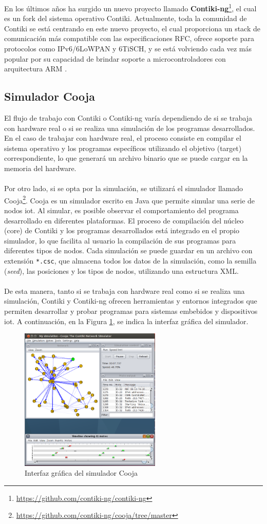 En los últimos años ha surgido un nuevo proyecto llamado \textbf{Contiki-ng}\footnote{\url{https://github.com/contiki-ng/contiki-ng}}, el cual es un fork del sistema operativo Contiki. Actualmente, toda la comunidad de Contiki se está centrando en este nuevo proyecto, el cual proporciona un stack de comunicación más compatible con las especificaciones RFC, ofrece soporte para protocolos como IPv6/6LoWPAN y 6TiSCH, y se está volviendo cada vez más popular por su capacidad de brindar soporte a microcontroladores con arquitectura ARM \cite{kurniawan2018practical}.

\subsection{Simulador Cooja}

El flujo de trabajo con Contiki o Contiki-ng varía dependiendo de si se trabaja con hardware real o si se realiza una simulación de los programas desarrollados. En el caso de trabajar con hardware real, el proceso consiste en compilar el sistema operativo y los programas específicos utilizando el objetivo (target) correspondiente, lo que generará un archivo binario que se puede cargar en la memoria del hardware.\\
\\
Por otro lado, si se opta por la simulación, se utilizará el simulador llamado Cooja\footnote{\url{https://github.com/contiki-ng/cooja/tree/master}}. Cooja es un simulador escrito en Java que permite simular una serie de nodos \gls{iot}. Al simular, es posible observar el comportamiento del programa desarrollado en diferentes plataformas. El proceso de compilación del núcleo (core) de Contiki y los programas desarrollados está integrado en el propio simulador, lo que facilita al usuario la compilación de sus programas para diferentes tipos de nodos. Cada simulación se puede guardar en un archivo con extensión \texttt{*.csc}, que almacena todos los datos de la simulación, como la semilla (\textit{seed}), las posiciones y los tipos de nodos, utilizando una estructura XML.\\
\\
De esta manera, tanto si se trabaja con hardware real como si se realiza una simulación, Contiki y Contiki-ng ofrecen herramientas y entornos integrados que permiten desarrollar y probar programas para sistemas embebidos y dispositivos \gls{iot}. A continuación, en la Figura \ref{fig:cooja}, se indica la interfaz gráfica del simulador.

\begin{figure}[ht]
    \centering
    \includegraphics[width=0.6\textwidth]{archivos/img/teoria/cooja.png}
    \caption{Interfaz gráfica del simulador Cooja \cite{cooja1}}
    \label{fig:cooja}
\end{figure}


